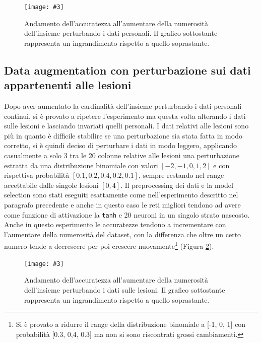 \documentclass[12pt, twoside, letterpaper]{report}
\newcommand{\img}[4] {
	\begin{figure}
		\centering
		\texttt{[image: \#3]}\\
		\caption{#1}
		\label{fig:#4}
	\end{figure}
}
\begin{document}
			\img{Andamento dell'accuratezza all'aumentare della numerosità dell'insieme perturbando i dati personali. Il grafico sottostante rappresenta un ingrandimento rispetto a quello soprastante.}{0.35}{accuracy_data_aug_pers.png}{accuracy_data_aug_pers}
			
		\subsection{Data augmentation con perturbazione sui dati appartenenti alle lesioni} \label{sec:data_aug_les}
			Dopo aver aumentato la cardinalità dell'insieme perturbando i dati personali continui, si è provato a ripetere l'esperimento ma questa volta alterando i dati sulle lesioni e lasciando invariati quelli personali. I dati relativi alle lesioni sono più  in quanto è difficile stabilire se una perturbazione sia stata fatta in modo corretto, si è quindi deciso di perturbare i dati in modo leggero, applicando casualmente a solo 3 tra le 20 colonne relative alle lesioni una perturbazione estratta da una distribuzione binomiale con valori $[-2, -1, 0, 1, 2]$ e con rispettiva probabilità $[0.1, 0.2, 0.4, 0.2, 0.1]$, sempre restando nel range accettabile dalle singole lesioni $[0,4]$. Il preprocessing dei dati e la model selection sono stati eseguiti esattamente come nell'esperimento descritto nel paragrafo precedente e anche in questo caso le reti migliori tendono ad avere come funzione di attivazione la \texttt{tanh} e 20 neuroni in un singolo strato nascosto. Anche in questo esperimento le accuratezze tendono a incrementare con l'aumentare della numerosità del dataset, con la differenza che oltre un certo numero tende a decrescere per poi crescere nuovamente\footnote{Si è provato a ridurre il range della distribuzione binomiale a [-1, 0, 1] con probabilità [0.3, 0,4, 0.3] ma non si sono riscontrati grossi cambiamenti.} (Figura \ref{fig:accuracy_data_aug_lesioni}). 
			\img{Andamento dell'accuratezza all'aumentare della numerosità dell'insieme perturbando i dati sulle lesioni. Il grafico sottostante rappresenta un ingrandimento rispetto a quello soprastante.}{0.35}{accuracy_data_aug_lesioni.png}{accuracy_data_aug_lesioni}
			
\end{document}
